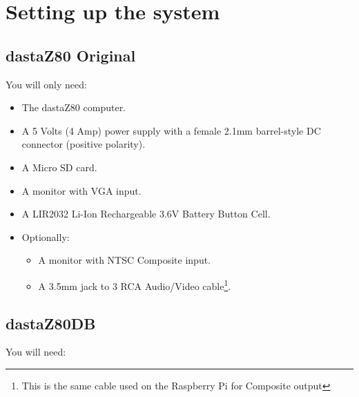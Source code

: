 \section{Setting up the system}
\label{sec:setting_system}

\subsection{dastaZ80 Original}

You will only need:

\begin{itemize}
    \item The dastaZ80 computer.
    \item A 5 Volts (4 Amp) power supply with a female 2.1mm barrel-style DC
    connector (positive polarity).
    \item A Micro SD card.
    \item A monitor with VGA input.
    \item A LIR2032 Li-Ion Rechargeable 3.6V Battery Button Cell.
    \item Optionally:
    \begin{itemize}
        \item A monitor with NTSC Composite input.
        \item A 3.5mm jack to 3 RCA Audio/Video cable\footnote{This is the same
            cable used on the Raspberry Pi for Composite output}.
    \end{itemize}
\end{itemize}

\subsection{dastaZ80DB}

You will need:

